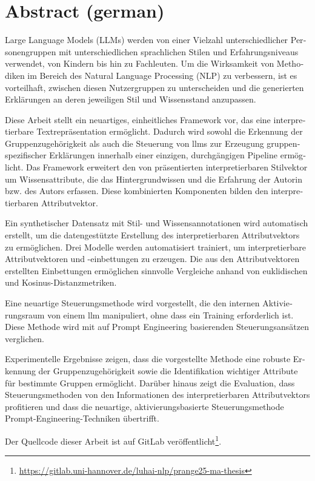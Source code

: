 

\vspace*{20mm}

\chapter*{Abstract (german)}%
\label{sec:abstract-german}
\vspace*{-10mm}

\begin{otherlanguage}{ngerman}
  \addtolength{\parskip}{-9pt}
  Large Language Models (LLMs) werden von einer Vielzahl unterschiedlicher Personengruppen mit unterschiedlichen sprachlichen Stilen und Erfahrungsniveaus verwendet, von Kindern bis hin zu Fachleuten. Um die Wirksamkeit von Methodiken im Bereich des Natural Language Processing (NLP) zu verbessern, ist es vorteilhaft, zwischen diesen Nutzergruppen zu unterscheiden und die generierten Erklärungen an deren jeweiligen Stil und Wissensstand anzupassen.

  Diese Arbeit stellt ein neuartiges, einheitliches Framework vor, das eine interpretierbare Textrepräsentation ermöglicht. Dadurch wird sowohl die Erkennung der Gruppenzugehörigkeit als auch die Steuerung von \acp{llm} zur Erzeugung gruppenspezifischer Erklärungen innerhalb einer einzigen, durchgängigen Pipeline ermöglicht. Das Framework erweitert den von \citet{patelLearningInterpretableStyle2023} präsentierten interpretierbaren Stilvektor um Wissensattribute, die das Hintergrundwissen und die Erfahrung der Autorin bzw. des Autors erfassen. Diese kombinierten Komponenten bilden den interpretierbaren Attributvektor.

  Ein synthetischer Datensatz mit Stil- und Wissensannotationen wird automatisch erstellt, um die datengestützte Erstellung des interpretierbaren Attributvektors zu ermöglichen. Drei Modelle werden automatisiert trainiert, um interpretierbare Attributvektoren und -einbettungen zu erzeugen. Die aus den Attributvektoren erstellten Einbettungen ermöglichen sinnvolle Vergleiche anhand von euklidischen und Kosinus-Distanzmetriken.

  Eine neuartige Steuerungsmethode wird vorgestellt, die den internen Aktivierungsraum von einem \ac{llm} manipuliert, ohne dass ein Training erforderlich ist. Diese Methode wird mit auf Prompt Engineering basierenden Steuerungsansätzen verglichen.

  Experimentelle Ergebnisse zeigen, dass die vorgestellte Methode eine robuste Erkennung der Gruppenzugehörigkeit sowie die Identifikation wichtiger Attribute für bestimmte Gruppen ermöglicht. Darüber hinaus zeigt die Evaluation, dass Steuerungsmethoden von den Informationen des interpretierbaren Attributvektors profitieren und dass die neuartige, aktivierungsbasierte Steuerungsmethode Prompt-Engineering-Techniken übertrifft.

  Der Quellcode dieser Arbeit ist auf GitLab veröffentlicht\footnote{\url{https://gitlab.uni-hannover.de/luhai-nlp/prange25-ma-thesis}}.
\end{otherlanguage}
